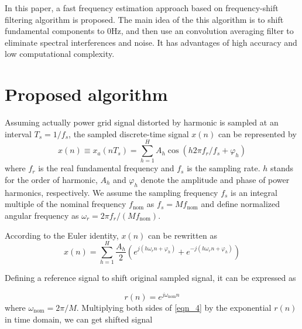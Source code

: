 \documentclass[journal,twoside]{IEEEtran}
\begin{document}
 In this paper, a fast frequency estimation approach based on frequency-shift filtering algorithm is proposed. 
 The main idea of the this algorithm is to shift fundamental components to 0Hz, and then use an convolution averaging filter to eliminate spectral interferences and noise. It has advantages of high accuracy and low computational complexity. 


\section{Proposed  algorithm}
Assuming  actually power grid signal distorted by harmonic is sampled at  an interval $T_s=1/f_s$,  the sampled discrete-time signal $x(n)$ can be represented by
\begin{equation}
x(n)\equiv x_a(nT_s)=\sum_{h=1}^{H}A_h\cos (h2\pi f_r/f_s+\varphi_h)\label{eqn_3}
\end{equation}
where $f_r$ is the real fundamental frequency and $f_s$ is the sampling rate. $h$ stands for the order of harmonic, $A_h$ and $\varphi_h$ denote the amplitude and phase of power harmonics, respectively.
We assume the sampling frequency $f_s$ is an integral multiple of the nominal frequency $f_\mathrm{nom}$ as $f_s=Mf_\mathrm{nom}$ and define normalized angular frequency as  $\omega_r=2\pi f_r/(Mf_\mathrm{nom})$. 

According to the Euler identity, $x(n)$ can be rewritten as
\begin{equation}
x(n)=\sum_{h=1}^{H}\dfrac{A_h}{2}\left(e^{j\left(h\omega_r n+\varphi_h\right)}+e^{-j\left(h\omega_r n+\varphi_h\right)}\right)\label{eqn_4}
\end{equation}



Defining a reference signal to shift original sampled signal, it can be expressed as 

\begin{equation}
r(n)=e^{j\omega_\mathrm{nom}n}\label{eqn_yao}
\end{equation}
where $\omega_\mathrm{nom}=2\pi /M$.  
Multiplying both sides of \eqref{eqn_4} by the exponential $r(n)$ in time domain, we can get shifted signal
\end{document}
